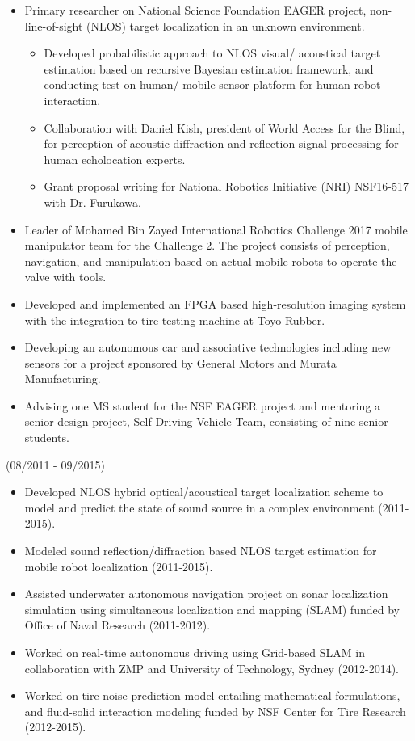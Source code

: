 \documentclass[11pt,letterpaper]{article}
\begin{document}
  \begin{itemize}
  	\item Primary researcher on National Science Foundation EAGER project, non-line-of-sight (NLOS) target localization in an unknown environment.
  	\begin{itemize}
  		\item Developed probabilistic approach to NLOS visual/ acoustical target estimation based on recursive Bayesian estimation framework, and conducting test on human/ mobile sensor platform for human-robot-interaction.
  		\item Collaboration with Daniel Kish, president of World Access for the Blind, for perception of acoustic diffraction and reflection signal processing for human echolocation experts.
  		\item Grant proposal writing for National Robotics Initiative (NRI) NSF16-517 with Dr. Furukawa.
  	\end{itemize}
  	\item Leader of Mohamed Bin Zayed International Robotics Challenge 2017 mobile manipulator team for the Challenge 2. The project consists of perception, navigation, and manipulation based on actual mobile robots to operate the valve with tools.
  	\item Developed and implemented an FPGA based high-resolution imaging system with the integration to tire testing machine at Toyo Rubber.
  	\item Developing an autonomous car and associative technologies including new sensors for a project sponsored by General Motors and Murata Manufacturing.
    \item Advising one MS student for the NSF EAGER project and mentoring a senior design project, Self-Driving Vehicle Team, consisting of nine senior students.
  \end{itemize}

  \hfill {(08/2011 - 09/2015)}\\
  \begin{itemize}
  \item Developed NLOS hybrid optical/acoustical target localization scheme to model and predict the state of sound source in a complex environment (2011-2015).
  \item Modeled sound reflection/diffraction based NLOS target estimation for mobile robot localization (2011-2015).
  \item Assisted underwater autonomous navigation project on sonar localization simulation using simultaneous localization and mapping (SLAM) funded by Office of Naval Research (2011-2012).
  \item Worked on real-time autonomous driving using Grid-based SLAM in collaboration with ZMP and University of Technology, Sydney (2012-2014).
  \item Worked on tire noise prediction model entailing mathematical formulations, and fluid-solid interaction modeling funded by NSF Center for Tire Research (2012-2015).
  \end{itemize}
\end{document}
